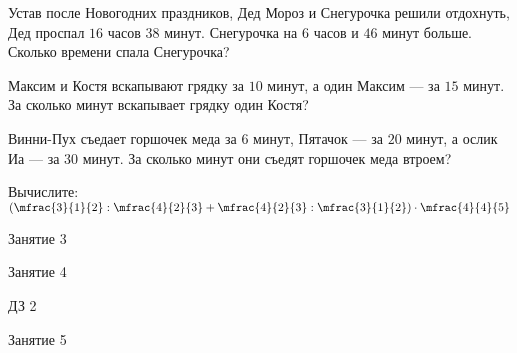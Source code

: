 
\begin{homework}[number=1]
	\begin{listofex}
		\item Устав после Новогодних праздников, Дед Мороз и Снегурочка решили отдохнуть, Дед проспал \( 16 \) часов \( 38 \) минут. Снегурочка на \( 6 \) часов и \( 46 \) минут больше. Сколько времени спала Снегурочка?
		\item Максим и Костя вскапывают грядку за \( 10 \) минут, а один Максим --- за \( 15 \) минут. За сколько минут	вскапывает грядку один Костя?
		\item Винни-Пух съедает горшочек меда за \( 6 \) минут, Пятачок --- за \( 20 \) минут, а ослик Иа --- за \( 30 \) минут. За сколько минут они съедят горшочек меда втроем?
		\item Вычислите: \quad \( \left( \mfrac{3}{1}{2}:\mfrac{4}{2}{3}+\mfrac{4}{2}{3}:\mfrac{3}{1}{2} \right)\cdot\mfrac{4}{4}{5} \)
	\end{listofex}
\end{homework}

\begin{class}[number=3]
	\begin{listofex}
		\item Занятие 3
	\end{listofex}
\end{class}

\begin{class}[number=4]
	\begin{listofex}
		\item Занятие 4
	\end{listofex}
\end{class}

\begin{homework}[number=2]
	\begin{listofex}
		\item ДЗ 2
	\end{listofex}
\end{homework}

\begin{class}[number=5]
	\begin{listofex}
		\item Занятие 5
	\end{listofex}
\end{class}

